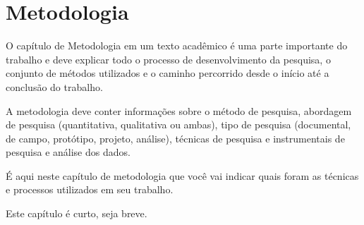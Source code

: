 \chapter{Metodologia}

O capítulo de Metodologia em um texto acadêmico é uma parte importante do trabalho e deve explicar todo o processo de desenvolvimento da pesquisa, o conjunto de métodos utilizados e o caminho percorrido desde o início até a conclusão do trabalho. 

A metodologia deve conter informações sobre o método de pesquisa, abordagem de pesquisa (quantitativa, qualitativa ou ambas), tipo de pesquisa (documental, de campo, protótipo, projeto, análise), técnicas de pesquisa e instrumentais de pesquisa e análise dos dados.

É aqui neste capítulo de metodologia que você vai indicar quais foram as técnicas e processos utilizados em seu trabalho.

Este capítulo é curto, seja breve.